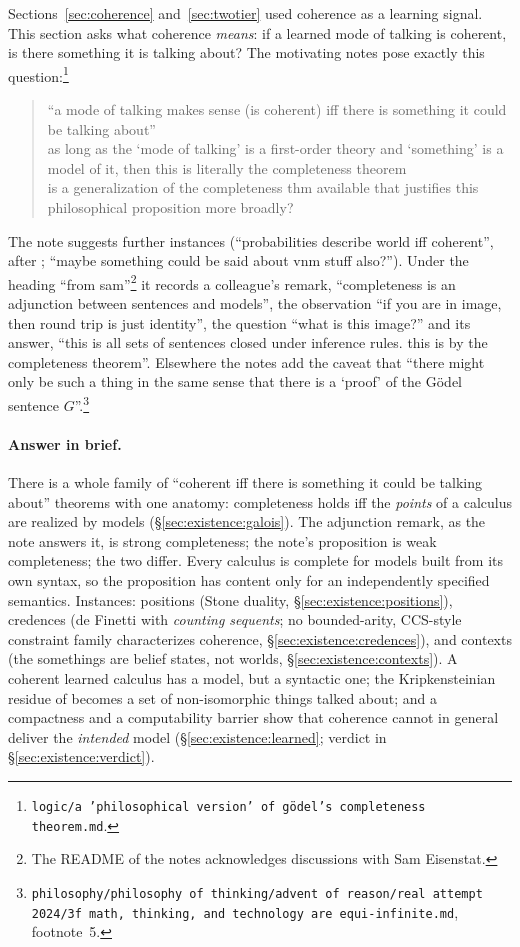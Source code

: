 Sections~\ref{sec:coherence} and~\ref{sec:twotier} used coherence as a learning signal. This section asks what coherence \emph{means}: if a learned mode of talking is coherent, is there something it is talking about? The motivating notes \citep{hanni2026notes} pose exactly this question:\footnote{\texttt{logic/a 'philosophical version' of g\"odel's completeness theorem.md}.}
\begin{quote}\small
``a mode of talking makes sense (is coherent) iff there is something it could be talking about'' \\
as long as the `mode of talking' is a first-order theory and `something' is a model of it, then this is literally the completeness theorem \\
is a generalization of the completeness thm available that justifies this philosophical proposition more broadly?
\end{quote}
The note suggests further instances (``probabilities describe world iff coherent'', after \citealt{christiano2013definability}; ``maybe something could be said about vnm stuff also?''). Under the heading ``from sam''\footnote{The README of the notes acknowledges discussions with Sam Eisenstat.} it records a colleague's remark, ``completeness is an adjunction between sentences and models'', the observation ``if you are in image, then round trip is just identity'', the question ``what is this image?'' and its answer, ``this is all sets of sentences closed under inference rules. this is by the completeness theorem''. Elsewhere the notes add the caveat that ``there might only be such a thing in the same sense that there is a `proof' of the G\"odel sentence $G$''.\footnote{\texttt{philosophy/philosophy of thinking/advent of reason/real attempt 2024/3f math, thinking, and technology are equi-infinite.md}, footnote~5.}

\paragraph{Answer in brief.} There is a whole family of ``coherent iff there is something it could be talking about'' theorems with one anatomy: completeness holds iff the \emph{points} of a calculus are realized by models (\S\ref{sec:existence:galois}). The adjunction remark, as the note answers it, is strong completeness; the note's proposition is weak completeness; the two differ. Every calculus is complete for models built from its own syntax, so the proposition has content only for an independently specified semantics. Instances: positions (Stone duality, \S\ref{sec:existence:positions}), credences (de Finetti with \emph{counting sequents}; no bounded-arity, CCS-style constraint family characterizes coherence, \S\ref{sec:existence:credences}), and contexts (the somethings are belief states, not worlds, \S\ref{sec:existence:contexts}). A coherent learned calculus has a model, but a syntactic one; the Kripkensteinian residue of  becomes a set of non-isomorphic things talked about; and a compactness and a computability barrier show that coherence cannot in general deliver the \emph{intended} model (\S\ref{sec:existence:learned}; verdict in \S\ref{sec:existence:verdict}).

